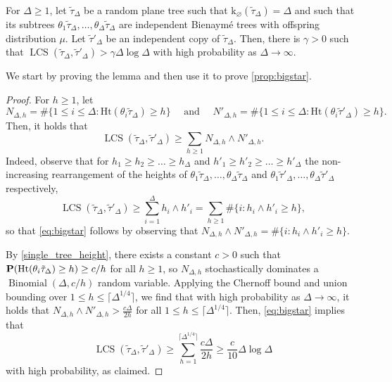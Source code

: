 \documentclass[11pt,reqno]{amsart}
\newcommand{\Ht}{\mathrm{Ht}}
\newcommand{\rk}{\mathrm{k}}
\newcommand{\LCS}{\operatorname{LCS}}
\begin{document}
\begin{lem}\label{lem:bigstar}
For $\Delta\ge 1$, let $\tilde{\tau}_\Delta$ be a random plane tree such that $\rk_\varnothing(\tilde{\tau}_\Delta)=\Delta$ and such that its subtrees $\theta_1\tilde{\tau}_\Delta,\ldots,\theta_{\Delta}\tilde{\tau}_\Delta$ are independent Bienaymé trees with offspring distribution $\mu$. Let $\tilde{\tau}'_\Delta$ be an independent copy of $\tilde{\tau}_\Delta$. 
Then, there is $\gamma > 0$ such that 
$\LCS(\tilde{\tau}_\Delta,\tilde{\tau}'_\Delta)>\gamma \Delta \log \Delta$ with high probability as $\Delta\to\infty$. 
\end{lem}
We start by proving the lemma and then use it to prove \cref{prop:bigstar}.
\begin{proof}
For $h\ge 1$, let \[N_{\Delta,h}=\#\{1\le i\le \Delta :\Ht(\theta_i\tilde{\tau}_\Delta)\ge h\}\quad \text{ and }\quad N'_{\Delta,h}=\#\{1\le i\le \Delta :\Ht(\theta_i\tilde{\tau}'_\Delta)\ge h\}.\]
Then, it holds that 
\begin{equation}\label{eq:bigstar}
\LCS(\tilde{\tau}_\Delta,\tilde{\tau}'_\Delta)
\ge \sum_{h\ge 1} 
N_{\Delta,h}\wedge N'_{\Delta,h}.
\end{equation}
Indeed, observe that for $h_1\ge h_2\ge\dots \ge h_\Delta$ and $h'_1\ge h'_2\ge\dots \ge h'_\Delta$ the non-increasing rearrangement of the heights of $\theta_1\tilde{\tau}_\Delta,\dots ,\theta_\Delta\tilde{\tau}_\Delta$ and $\theta_1\tilde{\tau}'_\Delta,\dots ,\theta_\Delta\tilde{\tau}'_\Delta$ respectively,
\[\LCS(\tilde{\tau}_\Delta,\tilde{\tau}'_\Delta)\ge \sum_{i=1}^\Delta h_i\wedge h'_i=\sum_{h\ge 1}\#\{i: h_i\wedge h'_i\ge h\},\]
so that \eqref{eq:bigstar} follows by observing that $N_{\Delta,h}\wedge N'_{\Delta,h}=\#\{i: h_i\wedge h'_i\ge h\}$. 

By \cref{single_tree_height}, there exists a constant $c>0$ such that  $\prob(\Ht(\theta_i\tilde{\tau}_\Delta)\ge h)\ge c/h$ for all $h\geq 1$, so $N_{\Delta,h}$ stochastically dominates a $\operatorname{Binomial}(\Delta, c/h)$ random variable. Applying the Chernoff bound and union bounding over $1\le h \le \lceil \Delta^{1/4}\rceil$, we find that with high probability as $\Delta\to\infty$, it holds that $N_{\Delta,h}\wedge N'_{\Delta,h}>\frac{c\Delta}{2h}$ for all $1\le h\le \lceil \Delta^{1/4}\rceil $. Then, \eqref{eq:bigstar} implies that  
\[\LCS(\tilde{\tau}_\Delta,\tilde{\tau}'_\Delta)
\ge \sum_{h=1}^{\lceil \Delta^{1/4}\rceil} \frac{c\Delta}{2h}\ge \frac{c}{10}\Delta\log \Delta 
\]
with high probability, as claimed. 
\end{proof}
\end{document}

